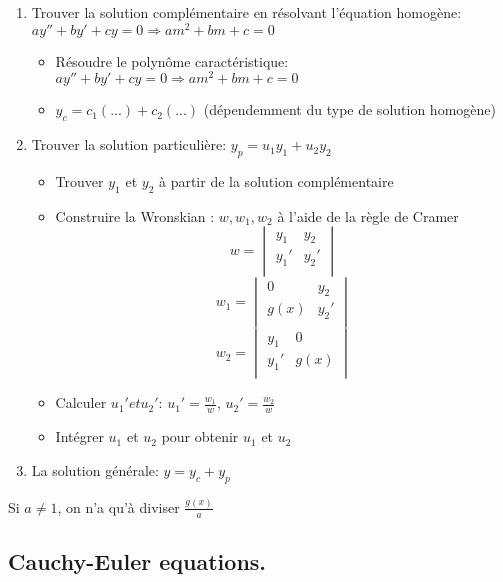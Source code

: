 \documentclass{article}
\begin{document}
\begin{enumerate}
    \item Trouver la solution complémentaire en résolvant l'équation
	homogène: $ay''+by'+cy=0 \Longrightarrow am^2+bm+c=0$
	\begin{itemize}
	    \item Résoudre le polynôme caractéristique: $ay''+by'+cy=0 \Longrightarrow am^2+bm+c=0$
	    \item $y_c = c_1 (...) + c_2 (...)$ (dépendemment du type de
		solution homogène)
	\end{itemize}
    \item Trouver la solution particulière: $ y_p = u_1 y_1 + u_2 y_2$
	\begin{itemize}
	    \item Trouver $y_1$ et $y_2$ à partir de la solution
		complémentaire
	    \item Construire la Wronskian : $w, w_1, w_2$ à l'aide de la
		règle de Cramer
		$$ w = \begin{vmatrix}
		    y_1 & y_2\\
		    y_1' & y_2'\\
		\end{vmatrix}$$
		$$ w_1 = \begin{vmatrix}
		    0 & y_2\\
		    g(x) & y_2'\\
		\end{vmatrix}$$
		$$ w_2 = \begin{vmatrix}
		    y_1 & 0\\
		    y_1' & g(x)\\
		\end{vmatrix}$$
	    \item Calculer $u_1 ' et u_2 '$: $u_1'=\frac{w_1}{w}$,
		$u_2'=\frac{w_2}{w}$
	    \item Intégrer $u_1$ et $u_2$ pour obtenir $u_1$ et $u_2$
	\end{itemize}
    \item La solution générale: $y=y_c+y_p$
\end{enumerate}

\begin{remark}
    Si $a \neq 1$, on n'a qu'à diviser $\frac{g(x)}{a}$
\end{remark}

\subsection{Cauchy-Euler equations.}
\end{document}
